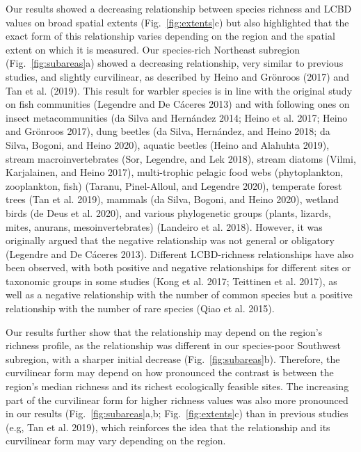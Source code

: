 \documentclass[11pt]{article}
\begin{document}
Our results showed a decreasing relationship between species richness
and LCBD values on broad spatial extents (Fig.~\ref{fig:extents}c) but
also highlighted that the exact form of this relationship varies
depending on the region and the spatial extent on which it is measured.
Our species-rich Northeast subregion (Fig.~\ref{fig:subareas}a) showed a
decreasing relationship, very similar to previous studies, and slightly
curvilinear, as described by Heino and Grönroos (2017) and Tan et al.
(2019). This result for warbler species is in line with the original
study on fish communities (Legendre and De Cáceres 2013) and with
following ones on insect metacommunities (da Silva and Hernández 2014;
Heino et al. 2017; Heino and Grönroos 2017), dung beetles (da Silva,
Hernández, and Heino 2018; da Silva, Bogoni, and Heino 2020), aquatic
beetles (Heino and Alahuhta 2019), stream macroinvertebrates (Sor,
Legendre, and Lek 2018), stream diatoms (Vilmi, Karjalainen, and Heino
2017), multi-trophic pelagic food webs (phytoplankton, zooplankton,
fish) (Taranu, Pinel-Alloul, and Legendre 2020), temperate forest trees
(Tan et al. 2019), mammals (da Silva, Bogoni, and Heino 2020), wetland
birds (de Deus et al. 2020), and various phylogenetic groups (plants,
lizards, mites, anurans, mesoinvertebrates) (Landeiro et al. 2018).
However, it was originally argued that the negative relationship was not
general or obligatory (Legendre and De Cáceres 2013). Different
LCBD-richness relationships have also been observed, with both positive
and negative relationships for different sites or taxonomic groups in
some studies (Kong et al. 2017; Teittinen et al. 2017), as well as a
negative relationship with the number of common species but a positive
relationship with the number of rare species (Qiao et al. 2015).

Our results further show that the relationship may depend on the
region's richness profile, as the relationship was different in our
species-poor Southwest subregion, with a sharper initial decrease
(Fig.~\ref{fig:subareas}b). Therefore, the curvilinear form may depend
on how pronounced the contrast is between the region's median richness
and its richest ecologically feasible sites. The increasing part of the
curvilinear form for higher richness values was also more pronounced in
our results (Fig.~\ref{fig:subareas}a,b; Fig.~\ref{fig:extents}c) than
in previous studies (e.g, Tan et al. 2019), which reinforces the idea
that the relationship and its curvilinear form may vary depending on the
region.
\end{document}
